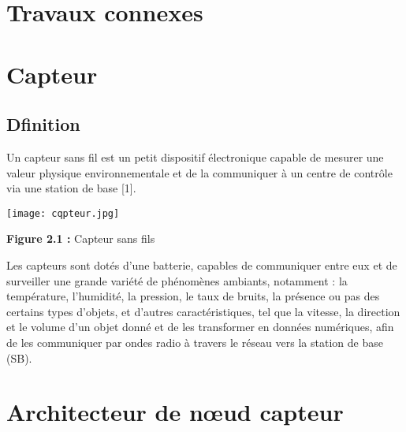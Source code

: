 \documentclass[paper=a4, fontsize=11pt]{scrartcl}
\numberwithin{equation}{section}		%
\numberwithin{figure}{section}			%
\numberwithin{table}{section}				%
\begin{document}
\section{Travaux connexes}
\section{Capteur }
\subsection{Dfinition}
Un capteur sans fil est un petit dispositif électronique capable de mesurer une valeur
physique environnementale et de la communiquer à un centre de contrôle via une station de
base [1]. \par

    \begin{center}
    \texttt{[image: cqpteur.jpg]} \par
    \caption{  \textbf{Figure 2.1 :} Capteur sans fils } \par
   \end{center}
Les capteurs sont dotés d’une batterie, capables de communiquer entre eux et de surveiller
une grande variété de phénomènes ambiants, notamment : la température, l’humidité, la
pression, le taux de bruits, la présence ou pas des certains types d’objets, et d’autres
caractéristiques, tel que la vitesse, la direction et le volume d’un objet donné et de les
transformer en données numériques, afin de les communiquer par ondes radio à travers le
réseau vers la station de base (SB).\par
\section{Architecteur de nœud capteur }
\end{document}
